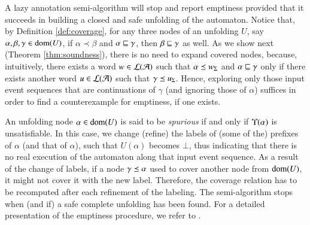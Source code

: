 
A lazy annotation semi-algorithm will stop and report emptiness
provided that it succeeds in building a closed and safe unfolding of
the automaton. Notice that, by Definition \ref{def:coverage}, for any
three nodes of an unfolding $U$, say $\alpha,\beta,\gamma \in
\mathrm{dom}(U)$, if $\alpha \prec \beta$ and $\alpha \sqsubseteq \gamma$, then
$\beta \sqsubseteq \gamma$ as well. As we show next (Theorem
\ref{thm:soundness}), there is no need to expand covered nodes,
because, intuitively, there exists a word $w \in {\mathcal L}({\mathcal{A}})$ such that
$\alpha \preceq {w}_\Sigma$ and $\alpha \sqsubseteq \gamma$ only if there
exists another word $u \in {\mathcal L}({\mathcal{A}})$ such that $\gamma \preceq
{u}_\Sigma$. Hence, exploring only those input event sequences that are
continuations of $\gamma$ (and ignoring those of $\alpha$) suffices in
order to find a counterexample for emptiness, if one exists.

An unfolding node $\alpha \in \mathrm{dom}(U)$ is said to be \emph{spurious}
if and only if $\Upsilon({\alpha})$ is unsatisfiable. In this case, we
change (refine) the labels of (some of the) prefixes of $\alpha$ (and
that of $\alpha$), such that $U(\alpha)$ becomes $\bot$, thus
indicating that there is no real execution of the automaton along that
input event sequence. As a result of the change of labels, if a node
$\gamma \preceq \alpha$ used to cover another node from $\mathrm{dom}(U)$, it
might not cover it with the new label. Therefore, the coverage
relation has to be recomputed after each refinement of the
labeling. The semi-algorithm stops when (and if) a safe complete
unfolding has been found. For a detailed presentation of the emptiness
procedure, we refer to \cite{IosifXu18}.

